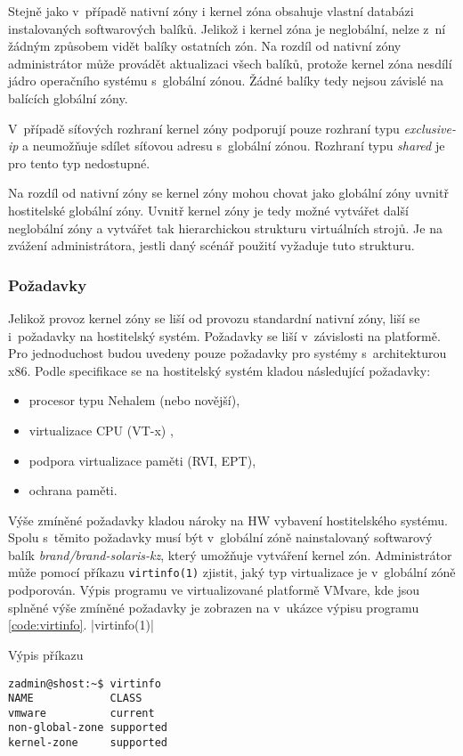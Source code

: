 Stejně jako v~případě nativní zóny i kernel zóna obsahuje vlastní databázi instalovaných softwarových balíků. Jelikož i 
kernel zóna je neglobální, nelze z~ní žádným způsobem vidět balíky ostatních zón. Na rozdíl od nativní zóny administrátor
může provádět aktualizaci všech balíků, protože kernel zóna nesdílí jádro operačního systému s~globální zónou. Žádné balíky
tedy nejsou závislé na balících globální zóny.

V~případě síťových rozhraní kernel zóny podporují pouze rozhraní typu \textit{exclusive-ip} a neumožňuje sdílet síťovou adresu
s~globální zónou. Rozhraní typu \textit{shared} je pro tento typ nedostupné.

Na rozdíl od nativní zóny se kernel zóny mohou chovat jako globální zóny uvnitř hostitelské globální zóny.
Uvnitř kernel zóny je tedy možné vytvářet další neglobální zóny a vytvářet tak hierarchickou strukturu virtuálních strojů. Je
na zvážení administrátora, jestli daný scénář použití vyžaduje tuto strukturu.
\subsubsection*{Požadavky}
\label{chapter:zones:types:kernel:demands}
Jelikož provoz kernel zóny se liší od provozu standardní nativní zóny, liší se i~požadavky na hostitelský systém. Požadavky
se liší v~závislosti na platformě. Pro jednoduchost budou uvedeny pouze požadavky pro systémy s~architekturou x86. Podle specifikace
\cite{oracle:solaris:zones:kernel_zones_requiremets} se na hostitelský systém kladou následující požadavky:
\begin{itemize}
 \item procesor typu Nehalem (nebo novější),
 \item virtualizace CPU (VT-x) ,
 \item podpora virtualizace paměti (RVI, EPT),
 \item ochrana paměti.
\end{itemize}
Výše zmíněné požadavky kladou nároky na HW vybavení hostitelského systému. Spolu s~těmito požadavky musí být v~globální zóně
nainstalovaný softwarový balík \textit{brand/brand-solaris-kz}, který umožňuje vytváření kernel zón. Administrátor může pomocí příkazu
\verb|virtinfo(1)| zjistit, jaký typ virtualizace je v~globální zóně podporován. Výpis programu ve virtualizované platformě
VMvare, kde jsou splněné výše zmíněné požadavky je zobrazen na v~ukázce výpisu programu \ref{code:virtinfo}.
|virtinfo(1)|
\begin{listing}
  \caption{Výpis příkazu \protect{}}
  \label{code:virtinfo}
  \begin{verbatim}
zadmin@shost:~$ virtinfo
NAME            CLASS     
vmware          current   
non-global-zone supported
kernel-zone     supported
  \end{verbatim}
\end{listing}
